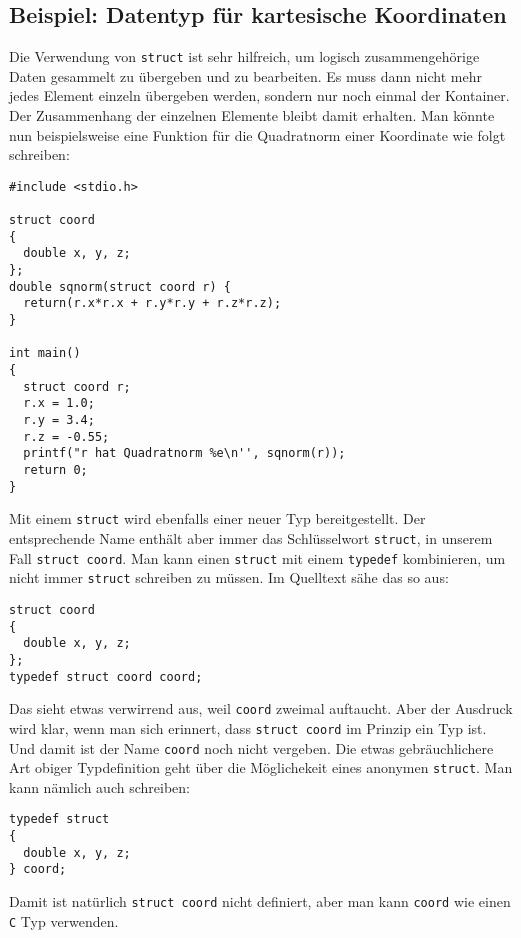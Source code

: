 \subsection{Beispiel: Datentyp für kartesische Koordinaten}

Die Verwendung von \verb|struct| ist sehr hilfreich, um logisch zusammengehörige Daten gesammelt zu übergeben und zu bearbeiten.
Es muss dann nicht mehr jedes Element einzeln übergeben werden, sondern nur noch einmal der Kontainer.
Der Zusammenhang der einzelnen Elemente bleibt damit erhalten.
Man könnte nun beispielsweise eine Funktion für die Quadratnorm einer Koordinate wie folgt schreiben:
\begin{lstlisting}
#include <stdio.h>

struct coord
{
  double x, y, z;
};
double sqnorm(struct coord r) {
  return(r.x*r.x + r.y*r.y + r.z*r.z);
}

int main()
{
  struct coord r;
  r.x = 1.0;
  r.y = 3.4;
  r.z = -0.55;
  printf("r hat Quadratnorm %e\n'', sqnorm(r));
  return 0;
}
\end{lstlisting}
Mit einem \verb|struct| wird ebenfalls einer neuer Typ bereitgestellt.
Der entsprechende Name enthält aber immer das Schlüsselwort \verb|struct|, in unserem Fall \verb|struct coord|. 
Man kann einen \verb|struct| mit einem \verb|typedef| kombinieren, um nicht immer \verb|struct| schreiben zu müssen.
Im Quelltext sähe das so aus:
\begin{lstlisting}
struct coord
{
  double x, y, z;
};
typedef struct coord coord;
\end{lstlisting}
Das sieht etwas verwirrend aus, weil \verb|coord| zweimal auftaucht.
Aber der Ausdruck wird klar, wenn man sich erinnert, dass \verb|struct coord| im Prinzip ein Typ ist.
Und damit ist der Name \verb|coord| noch nicht vergeben.
Die etwas gebräuchlichere Art obiger Typdefinition geht über die Möglichekeit eines anonymen \verb|struct|.
Man kann nämlich auch schreiben:
\begin{lstlisting}
typedef struct
{
  double x, y, z;
} coord;
\end{lstlisting}
Damit ist natürlich \verb|struct coord| nicht definiert, aber man kann \verb|coord| wie einen \texttt{C} Typ verwenden.


\endinput

